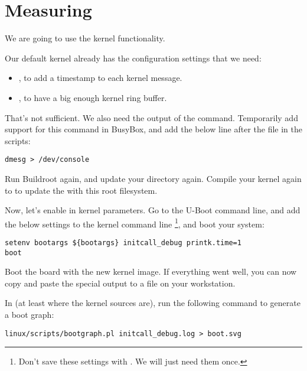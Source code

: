 
\section{Measuring}

We are going to use the kernel  functionality.

Our default kernel already has the configuration settings that we need:
\begin{itemize}
\item {}, to add a timestamp to each kernel
message.
\item {}, to have a big enough kernel ring buffer.
\end{itemize}

That's not sufficient. We also need the output of the 
command. Temporarily add support for this command in BusyBox,
and add the below line after the  file in the
 scripts:

\begin{verbatim}
dmesg > /dev/console
\end{verbatim}

Run Buildroot again, and update your
 directory again. Compile your
kernel again to to update the  with this root filesystem.

Now, let's enable  in kernel parameters. Go to
the U-Boot command line, and add the below settings to the kernel command line
\footnote{Don't save these settings with . We
will just need them once.}, and boot your system:
\begin{verbatim}
setenv bootargs ${bootargs} initcall_debug printk.time=1
boot
\end{verbatim}

Boot the board with the new kernel image. If everything went well,
you can now copy and paste the special  output to
a  file on your workstation.

In  (at least where the kernel sources
are), run the following command to generate a boot graph:

\begin{verbatim}
linux/scripts/bootgraph.pl initcall_debug.log > boot.svg
\end{verbatim}

